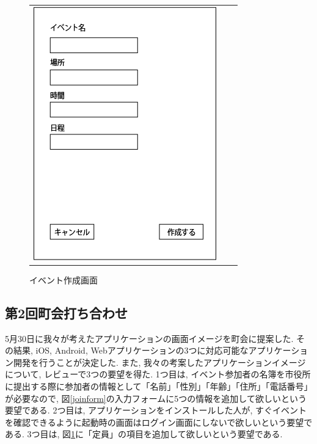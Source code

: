\begin{figure}[h]
\begin{tabular}{ccc}
\begin{minipage}[t]{0.33\hsize}
        \caption{参加フォーム画面}
        \label{joinform}
      \end{minipage}
      \begin{minipage}[t]{0.33\hsize}
        \centering
        \includegraphics[keepaspectratio, scale=0.4]{process_figures/old_create_event.png}
        \caption{イベント作成画面}
        \label{create_event.old}
      \end{minipage}
    \end{tabular}
\end{figure}

\subsection{第2回町会打ち合わせ}
\label{first_review}
5月30日に我々が考えたアプリケーションの画面イメージを町会に提案した.
その結果, iOS, Android, Webアプリケーションの3つに対応可能なアプリケーション開発を行うことが決定した.
また, 我々の考案したアプリケーションイメージについて, レビューで3つの要望を得た.
1つ目は, イベント参加者の名簿を市役所に提出する際に参加者の情報として「名前」「性別」「年齢」「住所」「電話番号」が必要なので,
図\ref{joinform}の入力フォームに5つの情報を追加して欲しいという要望である.
2つ目は, アプリケーションをインストールした人が, すぐイベントを確認できるように起動時の画面はログイン画面にしないで欲しいという要望である.
3つ目は, 図\ref{create_event.old}に「定員」の項目を追加して欲しいという要望である.

